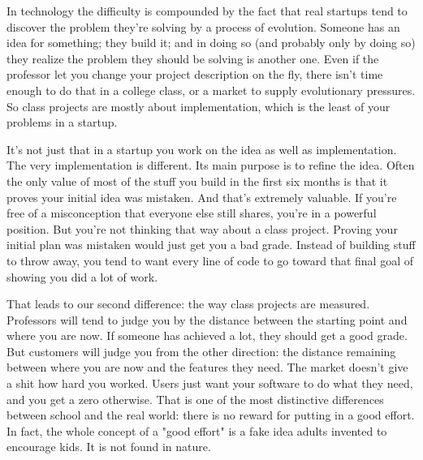In technology the difficulty is
                  compounded by the fact that real startups tend to discover the
                  problem they're solving by a process of evolution. Someone has
                  an idea for something; they build it; and in doing so (and
                  probably only by doing so) they realize the problem they
                  should be solving is another one. Even if the professor let
                  you change your project description on the fly, there isn't
                  time enough to do that in a college class, or a market to
                  supply evolutionary pressures. So class projects are mostly
                  about implementation, which is the least of your problems in a
                  startup.

It's not just that in a startup you work
                  on the idea as well as implementation. The very implementation
                  is different. Its main purpose is to refine the idea. Often
                  the only value of most of the stuff you build in the first six
                  months is that it proves your initial idea was mistaken. And
                  that's extremely valuable. If you're free of a misconception
                  that everyone else still shares, you're in a powerful
                  position. But you're not thinking that way about a class
                  project. Proving your initial plan was mistaken would just get
                  you a bad grade. Instead of building stuff to throw away, you
                  tend to want every line of code to go toward that final goal
                  of showing you did a lot of work.

That leads to our
                  second difference: the way class projects are measured.
                  Professors will tend to judge you by the distance between the
                  starting point and where you are now. If someone has achieved
                  a lot, they should get a good grade. But customers will judge
                  you from the other direction: the distance remaining between
                  where you are now and the features they need. The market
                  doesn't give a shit how hard you worked. Users just want your
                  software to do what they need, and you get a zero otherwise.
                  That is one of the most distinctive differences between school
                  and the real world: there is no reward for putting in a good
                  effort. In fact, the whole concept of a "good effort" is a
                  fake idea adults invented to encourage kids. It is not found
                  in nature.

